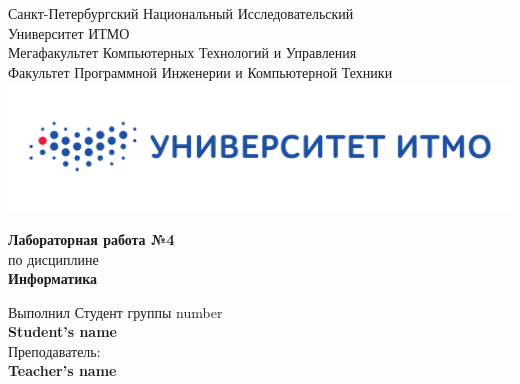 \documentclass[12pt,onecolumn]{article}
\begin{document}
\setcounter{tocdepth}{4}
\begin{center}
    Санкт-Петербургский Национальный Исследовательский\\ 
    Университет ИТМО\\
    Мегафакультет Компьютерных Технологий и Управления\\
    Факультет Программной Инженерии и Компьютерной Техники \\
    \includegraphics[scale=0.3]{itm.jpg} %
\end{center}
\vspace{1cm}


\begin{center}
    \textbf{Лабораторная работа №4}\\
    по дисциплине\\
    \textbf{Информатика}
\end{center}

\vspace{2cm}

\begin{flushright}
  Выполнил Студент  группы number\\
  \textbf{Student's name}\\
  Преподаватель: \\
  \textbf{Teacher's name}\\
\end{flushright}
\end{document}
